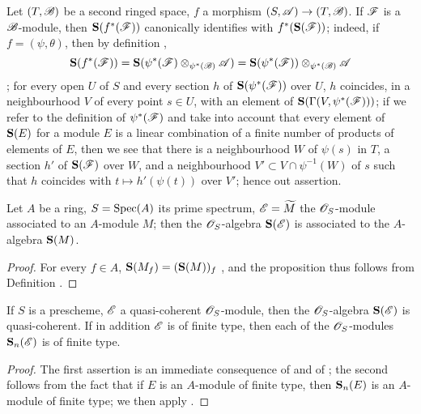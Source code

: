 \begin{env}[1.7.5]
\label{II.1.7.5}
Let $(T,\mathscr{B})$ be a second ringed space, $f$ a morphism $(S,\sh{A})\to(T,\sh{B})$.
If $\mathscr{F}$ is a $\mathscr{B}$-module, then $\mathbf{S}(f^*(\mathscr{F}))$ canonically identifies with $f^*(\mathbf{S}(\mathscr{F}))$; indeed, if $f=(\psi,\theta)$, then by definition ,
\[
  \mathbf{S}(f^*(\mathscr{F}))=\mathbf{S}(\psi^*(\mathscr{F})\otimes_{\psi^*(\mathscr{B})}\mathscr{A})=\mathbf{S}(\psi^*(\mathscr{F}))\otimes_{\psi^*(\mathscr{B})}\mathscr{A}
\]
; for every open $U$ of $S$ and every section $h$ of $\mathbf{S}(\psi^*(\mathscr{F}))$ over $U$, $h$ coincides, in a neighbourhood $V$ of every point $s\in U$, with an element of $\mathbf{S}(\Gamma(V,\psi^*(\mathscr{F})))$; if we refer to the definition of $\psi^*(\mathscr{F})$  and take into account that every element of $\mathbf{S}(E)$ for a module $E$ is a linear combination of a finite number of products of elements of $E$, then we see that there is a neighbourhood $W$ of $\psi(s)$ in $T$, a section $h'$ of $\mathbf{S}(\mathscr{F})$ over $W$, and a neighbourhood $V'\subset V\cap\psi^{-1}(W)$ of $s$ such that $h$ coincides with $t\mapsto h'(\psi(t))$ over $V'$; hence out assertion.
\end{env}

\begin{proposition}[1.7.6]
\label{II.1.7.6}
Let $A$ be a ring, $S=\operatorname{Spec}(A)$ its prime spectrum, $\mathscr{E}=\widetilde{M}$ the $\mathscr{O}_S$-module associated to an $A$-module $M$; then the $\mathscr{O}_S$-algebra $\mathbf{S}(\mathscr{E})$ is associated to the $A$-algebra $\mathbf{S}(M)$.
\end{proposition}

\begin{proof}
For every $f\in A$, $\mathbf{S}(M_f)=(\mathbf{S}(M))_f$ , and the proposition thus follows from Definition .
\end{proof}

\begin{corollary}[1.7.7]
\label{II.1.7.7}
If $S$ is a prescheme, $\mathscr{E}$ a quasi-coherent $\mathscr{O}_S$-module, then the $\mathscr{O}_S$-algebra $\mathbf{S}(\mathscr{E})$ is quasi-coherent.
If in addition $\mathscr{E}$ is of finite type, then each of the $\mathscr{O}_S$-modules $\mathbf{S}_n(\mathscr{E})$ is of finite type.
\end{corollary}

\begin{proof}
The first assertion is an immediate consequence of  and of ; the second follows from the fact that if $E$ is an $A$-module of finite type, then $\mathbf{S}_n(E)$ is an $A$-module of finite type; we then apply .
\end{proof}

